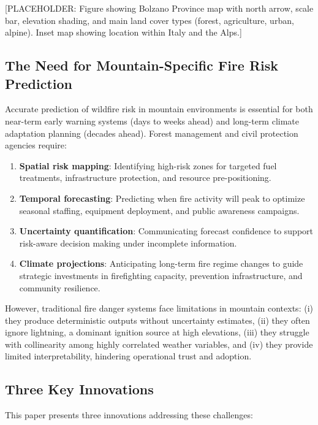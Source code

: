\documentclass[11pt,a4paper]{article}
\begin{document}
[PLACEHOLDER: Figure showing Bolzano Province map with north arrow, scale bar, elevation shading, and main land cover types (forest, agriculture, urban, alpine). Inset map showing location within Italy and the Alps.]

\subsection{The Need for Mountain-Specific Fire Risk Prediction}

Accurate prediction of wildfire risk in mountain environments is essential for both near-term early warning systems (days to weeks ahead) and long-term climate adaptation planning (decades ahead). Forest management and civil protection agencies require:

\begin{enumerate}
    \item \textbf{Spatial risk mapping}: Identifying high-risk zones for targeted fuel treatments, infrastructure protection, and resource pre-positioning.
    \item \textbf{Temporal forecasting}: Predicting when fire activity will peak to optimize seasonal staffing, equipment deployment, and public awareness campaigns.
    \item \textbf{Uncertainty quantification}: Communicating forecast confidence to support risk-aware decision making under incomplete information.
    \item \textbf{Climate projections}: Anticipating long-term fire regime changes to guide strategic investments in firefighting capacity, prevention infrastructure, and community resilience.
\end{enumerate}

However, traditional fire danger systems face limitations in mountain contexts: (i) they produce deterministic outputs without uncertainty estimates, (ii) they often ignore lightning, a dominant ignition source at high elevations, (iii) they struggle with collinearity among highly correlated weather variables, and (iv) they provide limited interpretability, hindering operational trust and adoption.

\subsection{Three Key Innovations}

This paper presents three innovations addressing these challenges:
\end{document}
